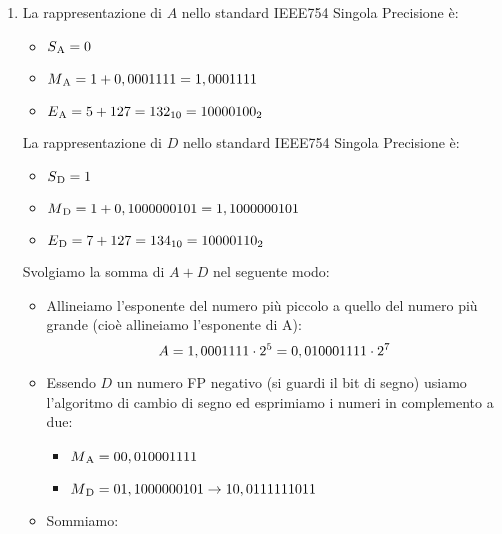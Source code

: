 \documentclass{article}
\begin{document}
\begin{enumerate}
    
    \item  La rappresentazione di $A$ nello standard IEEE754 Singola Precisione è:\begin{itemize}
            \item[] $S\textsubscript{A}=0$
            \item[] $M\textsubscript{A}=1+0,0001111=1,0001111$
            \item[] $E\textsubscript{A}=5+127=132\textsubscript{10}=10000100\textsubscript{2}$
        \end{itemize}
 La rappresentazione di $D$ nello standard IEEE754 Singola Precisione è:    \begin{itemize}
        \item[] $S\textsubscript{D}=1$
        \item[] $M\textsubscript{D}=1+0,1000000101=1,1000000101$
        \item[] $E\textsubscript{D}=7+127=134\textsubscript{10}=10000110\textsubscript{2}$
    \end{itemize}
    Svolgiamo la somma di $A+D$ nel seguente modo:
    \begin{itemize}
        \item Allineiamo l'esponente del numero pi\`u piccolo a quello del numero pi\`u grande (cio\`e allineiamo l'esponente di A):
$$A=1,0001111\cdot2\textsuperscript{5}=0,010001111\cdot2\textsuperscript{7}$$
        \item Essendo $D$ un numero FP negativo (si guardi il bit di segno) usiamo l'algoritmo di cambio di segno ed esprimiamo i numeri in complemento a due:
            \begin{itemize}
                \item[] $M\textsubscript{A}=00,010001111$
                \item[] $M\textsubscript{D}=01,1000000101 \rightarrow 10,0111111011$
            \end{itemize}
        \item Sommiamo:
        \begin{center}
\end{center}
\end{itemize}
\end{enumerate}
\end{document}
